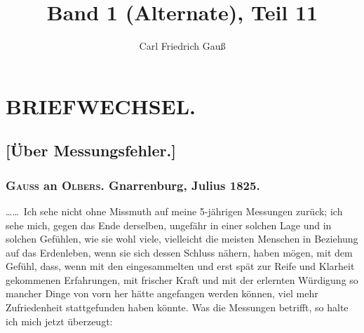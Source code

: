 \documentclass[12pt,a4paper]{article}
\title{Band 1 (Alternate), Teil 11}
\author{Carl Friedrich Gau\ss}
\date{}
\theoremstyle{plain}
\theoremstyle{definition}
\theoremstyle{remark}
\begin{document}
\maketitle

\section*{BRIEFWECHSEL.}

\subsection*{[Über Messungsfehler.]}

\subsubsection*{\textsc{Gauss} an \textsc{Olbers}. Gnarrenburg, Julius 1825.}

\ldots\ldots\ Ich sehe nicht ohne Missmuth auf meine 5-jährigen Messungen
zurück; ich sehe mich, gegen das Ende derselben, ungefähr in einer solchen
Lage und in solchen Gefühlen, wie sie wohl viele, vielleicht die meisten
Menschen in Beziehung auf das Erdenleben, wenn sie sich dessen Schluss
nähern, haben mögen, mit dem Gefühl, dass, wenn mit den eingesammelten
und erst spät zur Reife und Klarheit gekommenen Erfahrungen, mit frischer
Kraft und mit der erlernten Würdigung so mancher Dinge von vorn her
hätte angefangen werden können, viel mehr Zufriedenheit stattgefunden haben
könnte. Was die Messungen betrifft, so halte ich mich jetzt überzeugt:
\end{document}
